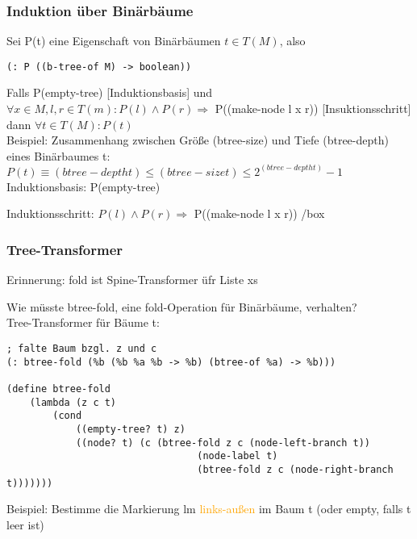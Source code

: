 \documentclass[paper=a4, fontsize=11pt]{scrartcl}
\numberwithin{equation}{section}
\numberwithin{figure}{section}
\numberwithin{table}{section}
\begin{document}
\begin{lstlistig}
\subsubsection{Induktion über Binärbäume}
Sei P(t) eine Eigenschaft von Binärbäumen $t \in T(M)$, also 
\begin{lstlisting}
(: P ((b-tree-of M) -> boolean))
\end{lstlisting}
Falls P(empty-tree) [Induktionsbasis] und $\forall x \in M,l,r \in T(m): P(l) \wedge P(r) \Rightarrow$ P((make-node l x r)) [Insuktionsschritt] dann $\forall t \in T(M): P(t)$ \\

Beispiel: Zusammenhang zwischen Größe (btree-size) und Tiefe (btree-depth) eines Binärbaumes t: \\

$P(t) \equiv (btree-depth t) \leq (btree-size t) \leq 2^{(btree-depth t)} -1$ \\

Induktionsbasis: P(empty-tree)

Induktionsschritt: $P(l) \wedge P(r) \Rightarrow$ P((make-node l x r))
\hfill /box

\subsubsection{Tree-Transformer}
Erinnerung: fold ist Spine-Transformer üfr Liste xs


Wie müsste btree-fold, eine fold-Operation für Binärbäume, verhalten? \\

Tree-Transformer für Bäume t:


\begin{lstlisting}
; falte Baum bzgl. z und c
(: btree-fold (%b (%b %a %b -> %b) (btree-of %a) -> %b)))

(define btree-fold
    (lambda (z c t)
        (cond
            ((empty-tree? t) z)
            ((node? t) (c (btree-fold z c (node-left-branch t))
                                 (node-label t)
                                 (btree-fold z c (node-right-branch t)))))))
\end{lstlisting}

Beispiel: Bestimme die Markierung lm \textcolor{orange}{links-außen} im Baum t (oder empty, falls t leer ist) \\


\end{lstlistig}
\end{document}
